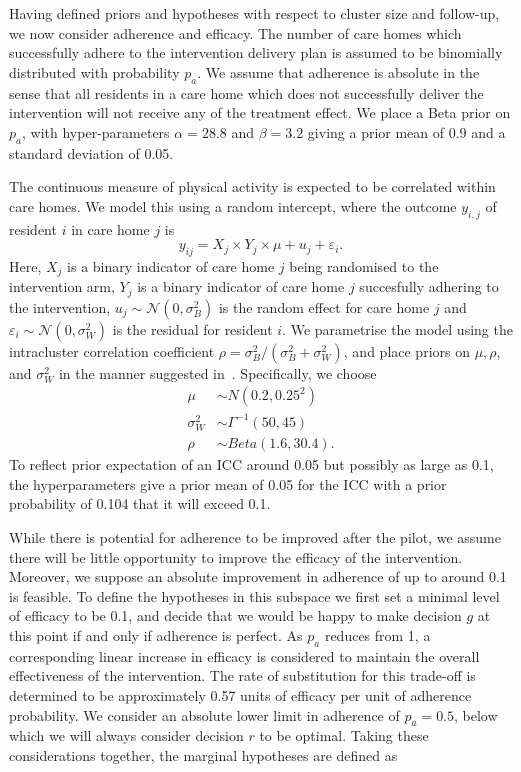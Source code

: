 \documentclass[AMA,STIX1COL]{WileyNJD-v2}
\begin{document}
Having defined priors and hypotheses with respect to cluster size and follow-up, we now consider adherence and efficacy. The number of care homes which successfully adhere to the intervention delivery plan is assumed to be binomially distributed with probability $p_{a}$. We assume that adherence is absolute in the sense that all residents in a care home which does not successfully deliver the intervention will not receive any of the treatment effect. We place a Beta prior on $p_{a}$, with hyper-parameters $\alpha = 28.8$ and $\beta = 3.2$ giving a prior mean of 0.9 and a standard deviation of 0.05.

The continuous measure of physical activity is expected to be correlated within care homes. We model this using a random intercept, where the outcome $y_{i,j}$ of resident $i$ in care home $j$ is
\begin{equation}
y_{ij} = X_{j} \times Y_{j} \times \mu + u_{j} + \varepsilon_{i}.
\end{equation}
Here, $X_{j}$ is a binary indicator of care home $j$ being randomised to the intervention arm, $Y_{j}$ is a binary indicator of care home $j$ succesfully adhering to the intervention, $u_{j} \sim \mathcal{N}(0, \sigma_{B}^{2})$ is the random effect for care home $j$ and $\varepsilon_{i} \sim \mathcal{N}(0, \sigma_{W}^{2})$ is the residual for resident $i$. We parametrise the model using the intracluster correlation coefficient $\rho = \sigma_{B}^{2} / (\sigma_{B}^{2} + \sigma_{W}^{2})$, and place priors on $\mu, \rho$, and $\sigma_{W}^{2}$ in the manner suggested in~\cite{Spiegelhalter2001}. Specifically, we choose
\begin{align}
\mu & \sim N(0.2, 0.25^{2}) \\
\sigma_{W}^{2} & \sim \Gamma^{-1}(50, 45) \\
\rho & \sim Beta(1.6, 30.4).
\end{align}
To reflect prior expectation of an ICC around 0.05 but possibly as large as 0.1, the hyperparameters give a prior mean of 0.05 for the ICC with a prior probability of 0.104 that it will exceed 0.1. 

While there is potential for adherence to be improved after the pilot, we assume there will be little opportunity to improve the efficacy of the intervention. Moreover, we suppose an absolute improvement in adherence of up to around 0.1 is feasible. To define the hypotheses in this subspace we first set a minimal level of efficacy to be 0.1, and decide that we would be happy to make decision $g$ at this point if and only if adherence is perfect. As $p_{a}$ reduces from 1, a corresponding linear increase in efficacy is considered to maintain the overall effectiveness of the intervention. The rate of substitution for this trade-off is determined to be approximately 0.57 units of efficacy per unit of adherence probability. We consider an absolute lower limit in adherence of $p_{a} = 0.5$, below which we will always consider decision $r$ to be optimal. Taking these considerations together, the marginal hypotheses are defined as
\end{document}
